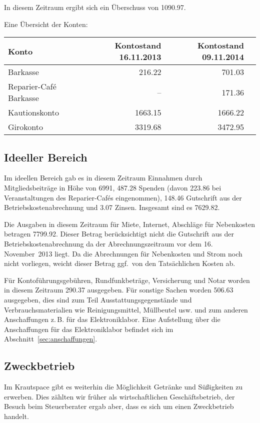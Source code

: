 \documentclass[ngerman,10pt,DIV16]{scrartcl}
\begin{document}
In diesem Zeitraum ergibt sich ein Überschuss von \SI{1090,97}{\EUR}.

Eine Übersicht der Konten:
\begin{table}[h!]
	\begin{tabular}{l|r|r|r}
	\textbf{Konto} & \textbf{Kontostand 16.11.2013} & \textbf{Kontostand 09.11.2014} \\ \hline
	Barkasse & \SI{216,22}{\EUR} & \SI{701,03}{\EUR} \\
	Reparier-Café Barkasse & -- & \SI{171,36}{\EUR} \\
	Kautionskonto & \SI{1663,15}{\EUR} & \SI{1666,22}{\EUR} \\
	Girokonto & \SI{3319,68}{\EUR} & \SI{3472,95}{\EUR}
	\end{tabular}
\end{table}

\subsection{Ideeller Bereich}
\label{sec:ideeller_bereich}

Im ideellen Bereich gab es in diesem Zeitraum Einnahmen durch Mitgliedsbeiträge in Höhe von \SI{6991}{\EUR}, \SI{487,28}{\EUR} Spenden (davon \SI{223,86}{\EUR} bei Veranstaltungen des Reparier-Cafés eingenommen), \SI{148,46}{\EUR} Gutschrift aus der Betriebskostenabrechnung und \SI{3,07}{\EUR} Zinsen.
Insgesamt sind es \SI{7629,82}{\EUR}.

Die Ausgaben in diesem Zeitraum für Miete, Internet, Abschläge für Nebenkosten betragen \SI{7799,92}{\EUR}.
Dieser Betrag berücksichtigt nicht die Gutschrift aus der Betriebskostenabrechnung da der Abrechnungszeitraum vor dem 16.\,November~2013 liegt.
Da die Abrechnungen für Nebenkosten und Strom noch nicht vorliegen, weicht dieser Betrag ggf.\ von den Tatsächlichen Kosten ab.

Für Kontoführungsgebühren, Rundfunkbeträge, Versicherung und Notar worden in diesem Zeitraum \SI{290,37}{\EUR} ausgegeben.
Für sonstige Sachen worden \SI{506,63}{\EUR} ausgegeben, dies sind zum Teil Ausstattungsgegenstände und Verbrauchsmaterialien wie Reinigungsmittel, Müllbeutel usw. und zum anderen Anschaffungen z.\,B. für das Elektroniklabor. Eine Aufstellung über die Anschaffungen für das Elektroniklabor befindet sich im Abschnitt~\ref{sec:anschaffungen}.

\subsection{Zweckbetrieb}
\label{sec:Zweckbetrieb}
Im Krautspace gibt es weiterhin die Möglichkeit Getränke und Süßigkeiten zu erwerben.
Dies zählten wir früher als wirtschaftlichen Geschäftsbetrieb, der Besuch beim Steuerberater ergab aber, dass es sich um einen Zweckbetrieb handelt.
\end{document}
